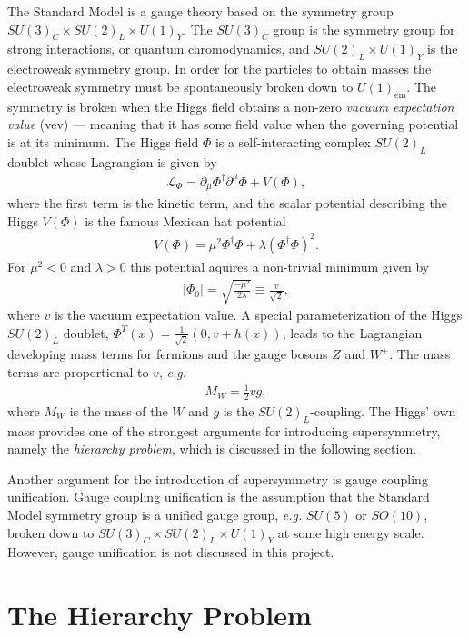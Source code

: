 \documentclass[twoside,english]{uiofysmaster}
\begin{document}
The Standard Model is a gauge theory based on the symmetry group $SU(3)_C \times SU(2)_L \times U(1)_Y$. The $SU(3)_C$ group is the symmetry group for strong interactions, or quantum chromodynamics, and $SU(2)_L \times U(1)_Y$ is the electroweak symmetry group. In order for the particles to obtain masses the electroweak symmetry must be spontaneously broken down to $U(1)_{\mathrm{em}}$. The symmetry is broken when the Higgs field obtains a non-zero \textit{vacuum expectation value} (vev) --- meaning that it has some field value when the governing potential is at its minimum. The Higgs field $\Phi$ is a self-interacting complex $SU(2)_L$ doublet whose Lagrangian is given by
\begin{align}
\mathcal{L}_{\Phi} = \partial_{\mu} \Phi^{\dagger} \partial^{\mu} \Phi + V(\Phi),
\end{align}
where the first term is the kinetic term, and the scalar potential describing the Higgs $V(\Phi)$ is the famous Mexican hat potential
\begin{align}
V(\Phi) = \mu^2 \Phi^{\dagger} \Phi + \lambda (\Phi^{\dagger} \Phi)^2.
\end{align}
For $\mu^2 < 0$ and $\lambda > 0$ this potential aquires a non-trivial minimum given by
\begin{align}
|\Phi_0| = \sqrt{\frac{-\mu^2}{2\lambda}} \equiv \frac{v}{\sqrt{2}},
\end{align}
where $v$ is the vacuum expectation value. A special parameterization of the Higgs $SU(2)_L$ doublet, $\Phi^T(x) = \frac{1}{\sqrt{2}} (0, v + h(x))$, leads to the Lagrangian developing mass terms for fermions and the gauge bosons $Z$ and $W^{\pm}$. The mass terms are proportional to $v$, \textit{e.g.}
\begin{align*}
M_W = \frac{1}{2} v g,
\end{align*}
where $M_W$ is the mass of the $W$ and $g$ is the $SU(2)_L$-coupling. The Higgs' own mass provides one of the strongest arguments for introducing supersymmetry, namely the \textit{hierarchy problem}, which is discussed in the following section. 

Another argument for the introduction of supersymmetry is gauge coupling unification. Gauge coupling unification is the assumption that the Standard Model symmetry group is a unified gauge group, \textit{e.g.} $SU(5)$ or $SO(10)$, broken down to $SU(3)_C \times SU(2)_L \times U(1)_Y$ at some high energy scale. However, gauge unification is not discussed in this project.

\section{The Hierarchy Problem}
\end{document}
